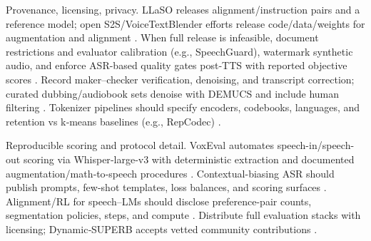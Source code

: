 Provenance, licensing, privacy. LLaSO releases alignment/instruction pairs and a reference model; open S2S/VoiceTextBlender efforts release code/data/weights for augmentation and alignment \cite{sun2025llasofoundationalframeworkreproduciblere,peng2025voicetextblenderaugmentinglargelanguagem}. When full release is infeasible, document restrictions and evaluator calibration (e.g., SpeechGuard), watermark synthetic audio, and enforce ASR-based quality gates post‑TTS with reported objective scores \cite{peri2024speechguardexploringadversarialrobustnes,zhao2024advancingspeechlanguagemodelsscalingsupe}. Record maker–checker verification, denoising, and transcript correction; curated dubbing/audiobook sets denoise with DEMUCS and include human filtering \cite{huang2023holisticcascadesystembenchmarkhumanevalu}. Tokenizer pipelines should specify encoders, codebooks, languages, and retention vs k‑means baselines (e.g., RepCodec) \cite{huang2024repcodecspeechrepresentationcodectokeniz}.

Reproducible scoring and protocol detail. VoxEval automates speech-in/speech-out scoring via Whisper‑large‑v3 with deterministic extraction and documented augmentation/math‑to‑speech procedures \cite{cui2025voxevalbenchmarkingknowledgeunderstandin}. Contextual-biasing ASR should publish prompts, few-shot templates, loss balances, and scoring surfaces \cite{sun2023contextualbiasingnamedentitieslargelangu}. Alignment/RL for speech–LMs should disclose preference-pair counts, segmentation policies, steps, and compute \cite{lin2025alignslmtextlessspokenlanguagemodelsrein}. Distribute full evaluation stacks with licensing; Dynamic‑SUPERB accepts vetted community contributions \cite{huang2025dynamicsuperbphase2collaborativelyexpand}.

